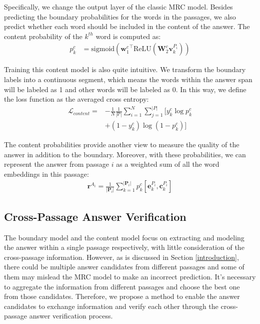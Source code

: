 \documentclass[11pt,a4paper]{article}
\newcommand{\matr}[1]{\mathbf{#1}}
\renewcommand{\vec}[1]{\mathbf{#1}}
\newcommand{\secref}[1]{Section \ref{#1}}
\begin{document}
Specifically, we change the output layer of the classic MRC model. Besides predicting the boundary probabilities for the words in the passages, we also predict whether each word should be included in the content of the answer. The content probability of the $k^{th}$ word is computed as:
\begin{align}
	p_k^c &= \textrm{sigmoid} ({\vec{w}_{1}^{c}}^{\intercal} \textrm{ReLU} (\matr{W}_{2}^c \vec{v}_k^{P_i}) )
\end{align}


Training this content model is also quite intuitive. We transform the boundary labels into a continuous segment, which means the words within the answer span will be labeled as 1 and other words will be labeled as 0. In this way, we define the loss function as the averaged cross entropy:
\begin{equation}
\begin{split}
	\mathcal{L}_{content} = & - \frac{1}{N} \frac{1}{|\textrm{P}|} \sum_{i=1}^N \sum_{j=1}^{|P|} [  y_k^c\log p_{k}^c \\ 
	& + (1-y_k^c)\log (1 - p_{k}^c)]
\end{split}
\end{equation}


The content probabilities provide another view to measure the quality of the answer in addition to the boundary. Moreover, with these probabilities, we can represent the answer from passage $i$ as a weighted sum of all the word embeddings in this passage:
\begin{align}
	\vec{r}^{A_i} = \frac{1}{|\matr{P}_{i}|}\sum\nolimits_{k=1}^{|\matr{P}_{i}|} p_k^c [{\vec{e}}_k^{P_i}, {\vec{c}}_k^{P_i}]
\end{align}


\subsection{Cross-Passage Answer Verification}
\label{verification}

The boundary model and the content model focus on extracting and modeling the answer within a single passage respectively, 
with little consideration of the cross-passage information. 
However, as is discussed in \secref{introduction}, there could be multiple answer candidates from different passages
and some of them may mislead the MRC model to make an incorrect prediction. It's necessary to aggregate the information from different passages and choose the best one from those candidates. Therefore, we propose a method to enable the answer candidates to exchange information and verify each other through the cross-passage answer verification process. 
\end{document}
